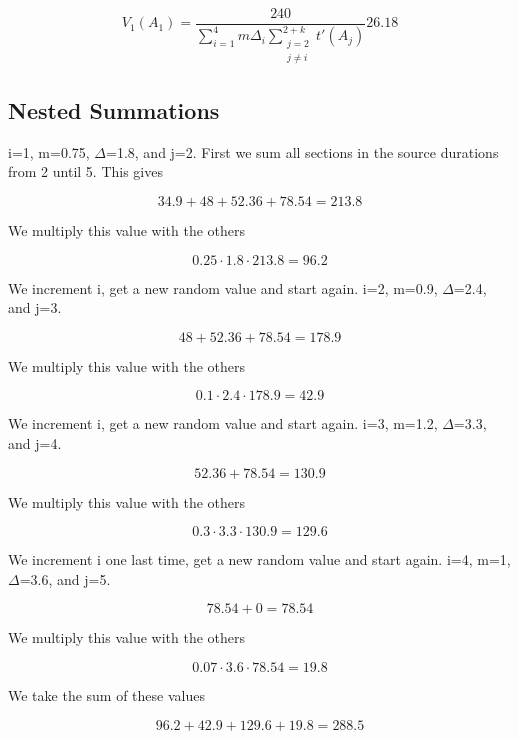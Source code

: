 \begin{equation}
V_{1}(A_{1}) = \frac{240}{\displaystyle\sum_{i=1}^{4} m \Delta_{i} \textstyle\sum_{\substack{j=2\\ j \neq i}}^{2+k} t'(A_{j})} 26.18
\end{equation}

\subsection{Nested Summations}

i=1, m=0.75, $\Delta$=1.8, and j=2. First we sum all sections in the source durations from 2 until 5. This gives

\[
34.9 + 48 + 52.36 + 78.54 = 213.8
\]

We multiply this value with the others

\[
0.25 \cdot 1.8 \cdot 213.8 = 96.2
\]

We increment i, get a new random value and start again. i=2, m=0.9, $\Delta$=2.4, and j=3.

\[
48 + 52.36 + 78.54 = 178.9
\]

We multiply this value with the others

\[
0.1 \cdot 2.4 \cdot 178.9 = 42.9
\]

We increment i, get a new random value and start again. i=3, m=1.2, $\Delta$=3.3, and j=4.

\[
52.36 + 78.54 = 130.9
\]

We multiply this value with the others

\[
0.3 \cdot 3.3 \cdot 130.9 = 129.6
\]

We increment i one last time, get a new random value and start again. i=4, m=1, $\Delta$=3.6, and j=5.

\[
78.54 + 0 = 78.54
\]

We multiply this value with the others

\[
0.07 \cdot 3.6 \cdot 78.54 = 19.8
\]

We take the sum of these values

\[
96.2 + 42.9 + 129.6 + 19.8 = 288.5
\]



